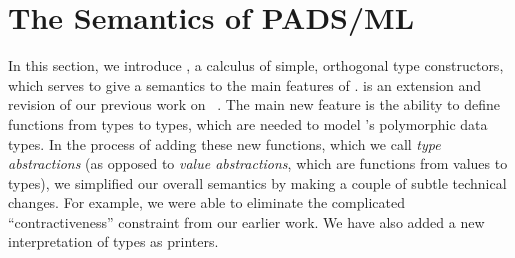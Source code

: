 \section{The Semantics of PADS/ML}
\label{sec:ddc}






In this section, we introduce \ddc{}, a calculus of simple, orthogonal
type constructors, which serves to give a semantics
to the main features of \padsml.  \ddc{} is an extension
and revision of our previous work on 
\ddcold{}~\cite{fisher+:next700ddl}.  The main new feature is 
the ability to define functions from types to types, 
which are needed to model \padsml's polymorphic data types.
In the process of adding these new functions, which we call {\em type
abstractions} (as opposed to {\em value abstractions}, which are functions 
from values to types), we simplified our overall semantics
by making a couple of subtle technical changes.  For example, we were
able to eliminate the complicated ``contractiveness'' constraint from our
earlier work.  We have also added a new interpretation of \ddc{} types
as printers.

